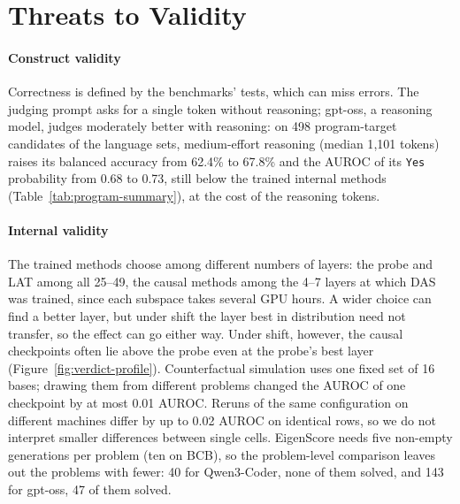 \section{Threats to Validity}
\label{sec:threats}
\paragraph{Construct validity}
Correctness is defined by the benchmarks' tests, which can miss errors. The
judging prompt asks for a single token without reasoning; gpt-oss, a
reasoning model, judges moderately  better with reasoning: on 498 program-target
candidates of the language sets, medium-effort reasoning (median 1{,}101
tokens) raises its balanced accuracy from 62.4\% to 67.8\% and the AUROC of its
\texttt{Yes} probability from 0.68 to 0.73, still below the trained internal
methods (Table~\ref{tab:program-summary}), at the cost of the reasoning
tokens. %

\paragraph{Internal validity}
The trained methods choose among different numbers of layers: the probe and
LAT among all 25--49, the causal methods among the 4--7 layers at which DAS
was trained, since each subspace takes several GPU hours. 
A wider choice can find a better layer, but under shift the layer best in distribution need not transfer, so the effect can go either way. Under shift, however, the causal checkpoints often lie above the probe even at the probe's best layer (Figure~\ref{fig:verdict-profile}).
Counterfactual simulation uses one fixed set of 16 bases;
drawing them from different problems changed the AUROC of one checkpoint by at
most 0.01 AUROC. 
Reruns of the same configuration on different machines differ by up to 0.02 AUROC on identical rows, so we do not interpret smaller differences between single cells.
EigenScore needs five non-empty generations per problem (ten on BCB), so the problem-level
comparison leaves out the problems with fewer: 40 for Qwen3-Coder, none of them
solved, and 143 for gpt-oss, 47 of them solved.

